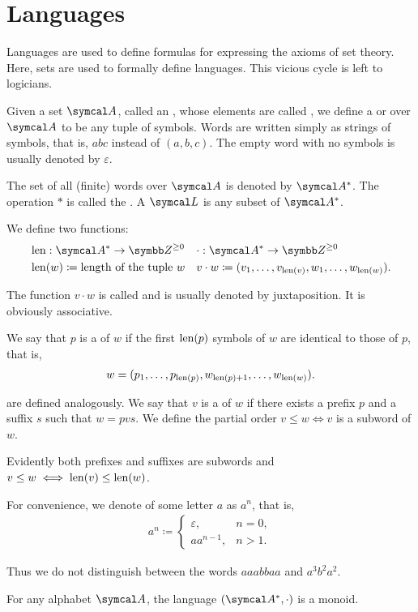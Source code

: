 \section{Languages}\label{sec:languages}

Languages are used to define formulas for expressing the axioms of set theory. Here, sets are used to formally define languages. This vicious cycle is left to logicians.

\begin{definition}\label{def:language}
  Given a set \( \Cal{A} \), called an , whose elements are called , we define a  or  over \( \Cal{A} \) to be any tuple of symbols. Words are written simply as strings of symbols, that is, \( abc \) instead of \( (a, b, c) \). The empty word with no symbols is usually denoted by \( \varepsilon \).

  The set of all (finite) words over \( \Cal{A} \) is denoted by \( \Cal{A}^{*} \). The operation \( * \) is called the . A  \( \Cal{L} \) is any subset of \( \Cal{A}^{*} \).

  We define two functions:
  \begin{align*}
    &\Len: \Cal{A}^{*} \to \BB{Z}^{\geq 0}
    &&\cdot: \Cal{A}^{*} \to \BB{Z}^{\geq 0}
    \\
    &\Len(w) \coloneqq \text{length of the tuple } w
    &&v \cdot w \coloneqq (v_1, \ldots, v_{\Len(v)}, w_1, \ldots, w_{\Len(w)}).
  \end{align*}

  The function \( v \cdot w \) is called  and is usually denoted by juxtaposition. It is obviously associative.

  We say that \( p \) is a  of \( w \) if the first \( \operatorname{len}(p) \) symbols of \( w \) are identical to those of \( p \), that is,
  \begin{align*}
    w = (p_1, \ldots, p_{\operatorname{len}(p)}, w_{\operatorname{len}(p) + 1}, \ldots, w_{\operatorname{len}(w)}).
  \end{align*}

   are defined analogously. We say that \( v \) is a  of \( w \) if there exists a prefix \( p \) and a suffix \( s \) such that \( w = pvs \). We define the partial order \( v \leq w \iff v \) is a subword of \( w \).

  Evidently both prefixes and suffixes are subwords and \( v \leq w \iff \operatorname{len}(v) \leq \operatorname{len}(w) \).

  For convenience, we denote  of some letter \( a \) as \( a^n \), that is,
  \begin{align*}
    a^n \coloneqq \begin{cases}
      \varepsilon, &n = 0, \\
      a a^{n-1}, &n > 1.
    \end{cases}
  \end{align*}

  Thus we do not distinguish between the words \( aaabbaa \) and \( a^3 b^2 a^2 \).
\end{definition}

\begin{proposition}\label{thm:set_of_all_words_is_monoid}
  For any alphabet \( \Cal{A} \), the language \( (\Cal{A}^{*}, \cdot) \) is a monoid.
\end{proposition}
